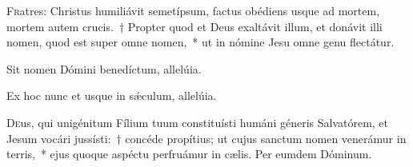\documentclass[vesperale_romanum.tex]{subfiles}
\begin{document}











\label{111_3a2}










\lettrine{F}{r}atres: Christus humiliávit semetípsum, factus obédiens usque ad mortem, mortem autem crucis.~† Propter quod et Deus exaltávit illum, et donávit illi nomen, quod est super omne nomen,~* ut in nómine Jesu omne genu flectátur.

\hymnus


\vv Sit nomen Dómini benedíctum, allelúia.

\rr Ex hoc nunc et usque in sǽculum, allelúia.

\admagnificat


\oratio

\lettrine{D}{e}us, qui unigénitum Fílium tuum constituísti humáni géneris Salvatórem, et Jesum vocári jussísti:~† concéde propítius; ut cujus sanctum nomen venerámur in terris,~* ejus quoque aspéctu perfruámur in cælis. Per eumdem Dóminum.
\end{document}

